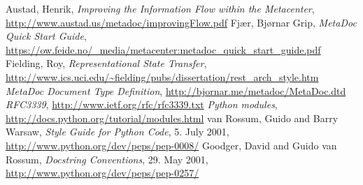 \newpage
\begin{thebibliography}{99}
     Austad, Henrik, \textit{Improving the Information
    Flow within the Metacenter},
    \url{http://www.austad.us/metadoc/improvingFlow.pdf}
     Fjær, Bjørnar Grip, \textit{MetaDoc Quick Start
    Guide},
    \url{https://ow.feide.no/_media/metacenter:metadoc_quick_start_guide.pdf}
     Fielding, Roy, \textit{Representational State Transfer},
    \url{http://www.ics.uci.edu/~fielding/pubs/dissertation/rest_arch_style.htm}
     \textit{MetaDoc Document Type Definition}, 
        \url{http://bjornar.me/metadoc/MetaDoc.dtd}
     \textit{RFC3339}, \url{http://www.ietf.org/rfc/rfc3339.txt}
     \textit{Python modules},
    \url{http://docs.python.org/tutorial/modules.html}
     van Rossum, Guido and Barry Warsaw, \textit{Style Guide for
    Python Code}, 5. July 2001, \url{http://www.python.org/dev/peps/pep-0008/}
     Goodger, David and Guido van Rossum, \textit{Docstring
    Conventions}, 29. May 2001, \url{http://www.python.org/dev/peps/pep-0257/}
\end{thebibliography}
